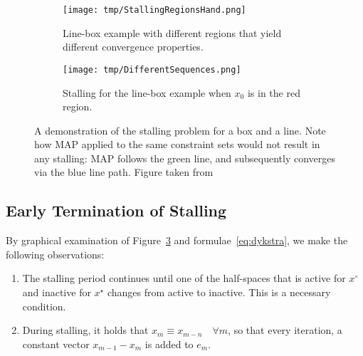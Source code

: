 \documentclass[hidelinks]{article}
\begin{document}
\begin{figure}[h]
    \centering
    \begin{subfigure}[t]{0.49\textwidth}
        \centering
        \texttt{[image: tmp/StallingRegionsHand.png]}
        \caption{Line-box example with different regions that yield different convergence properties.}
        \label{fig:region}
    \end{subfigure}
    \hfill
    \begin{subfigure}[t]{0.49\textwidth}
        \centering
        \texttt{[image: tmp/DifferentSequences.png]}
        \caption{Stalling for the line-box example when $x_0$ is in the red region.}
        \label{fig:stalling}
    \end{subfigure}
    \caption{A demonstration of the stalling problem for a box and a line. Note how MAP applied to the same constraint sets would not result in any stalling: MAP follows the green line, and subsequently converges via the blue line path. Figure taken from~\cite{DYKSTRASTALLING}}
    \label{fig:baushkeStall}
\end{figure}

\subsection{Early Termination of Stalling}

By graphical examination of Figure~\ref{fig:baushkeStall} and formulae~\eqref{eq:dykstra}, we make the following observations:
\begin{enumerate}
\item The stalling period continues until one of the half-spaces that is active for $x^\circ$ and inactive for $x^\star$ changes from active to inactive. This is a necessary condition.
\item During stalling, it holds that $x_m\equiv x_{m-n}\quad\forall m$, so that every iteration, a constant vector $x_{m-1}-x_m$ is added to $e_m$.
\end{enumerate}
\end{document}
